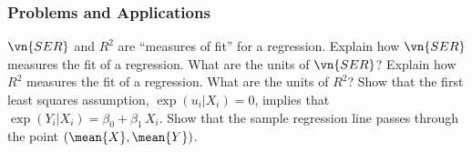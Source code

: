 

\begin{frame}
\frametitle{Problems and Applications}
$\vn{SER}$ and $R^2$ are ``measures of fit'' for a regression. Explain how $\vn{SER}$ measures the fit of a regression. What are the units of $\vn{SER}$? Explain how $R^2$ measures the fit of a regression. What are the units of $R^2$?
\bigskip
{}
Show that the first least squares assumption, $\exp(u_i|X_i)=0$, implies that $\exp(Y_i|X_i)=\beta_0+\beta_1\,X_i$.
\bigskip
{}
Show that the sample regression line passes through the point $(\mean{X},\mean{Y})$.
\end{frame}

